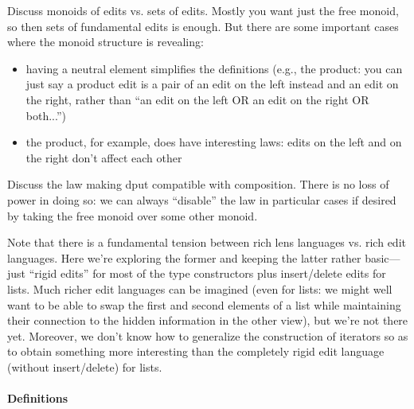 \begin{defn}[$R$-similarity]
\begin{theorem}
\begin{lemma}
\begin{theorem}[No products]
\begin{lemma}
\begin{defn}
\begin{theorem}
\begin{corollary}[Hylomorphism]
\begin{defn}
\begin{defn}[Symmetrization]
\begin{theorem}
Discuss monoids of edits vs. sets of edits.  Mostly you want just the free
monoid, so then sets of fundamental edits is enough.  But there are some
important cases where the monoid structure is revealing:
\begin{itemize}
\item having a neutral element simplifies the definitions (e.g., the
product: you can just say a product edit is a pair of an edit on the left
instead and an edit on the right, rather than ``an edit on the left OR an
edit on the right OR both...'')
\item the product, for example, does have interesting laws: edits on the
left and on the right don't affect each other
\end{itemize}

Discuss the law making dput compatible with composition.  There is no loss
of power in doing so: we can always ``disable'' the law in particular cases
if desired by taking the free monoid over some other monoid.  \fi

Note that there is a fundamental tension between rich lens languages vs.
rich edit languages.  Here we're exploring the former and keeping the latter
rather basic---just ``rigid edits'' for most of the type constructors plus
insert/delete edits for lists.  Much richer edit languages can be imagined
(even for lists: we might well want to be able to swap the first and second
elements of a list while maintaining their connection to the hidden
information in the other view), but we're not there yet.  Moreover, we don't
know how to generalize the construction of iterators so as to obtain
something more interesting than the completely rigid edit language (without
insert/delete) for lists.

\paragraph*{Definitions}


\end{theorem}
\end{defn}
\end{defn}
\end{corollary}
\end{theorem}
\end{defn}
\end{lemma}
\end{theorem}
\end{lemma}
\end{theorem}
\end{defn}
